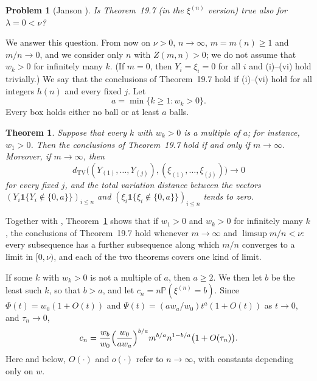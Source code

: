 \documentclass[11pt]{amsart}
\newtheorem{theorem}{Theorem}[section]
\newtheorem*{problem*}{Problem}
\theoremstyle{definition}
\theoremstyle{remark}
\numberwithin{equation}{section}
\newcommand{\Pp}{\mathbb P}
\newcommand{\dtv}{d_{\mathrm{TV}}}
\newcommand{\one}{\mathbf 1}
\begin{document}
\begin{problem*}[{Janson \cite[Problem~19.9]{J12}}]
Is Theorem~19.7 (in the $\xi^{(n)}$ version) true also for $\lambda=0<\nu$?
\end{problem*}

We answer this question. From now on $\nu>0$, $n\to\infty$, $m=m(n)\ge1$ and $m/n\to0$, and we consider only $n$ with $Z(m,n)>0$; we do not assume that $w_k>0$ for infinitely many $k$. (If $m=0$, then $Y_i=\xi_i=0$ for all $i$ and (i)--(vi) hold trivially.) We say that the conclusions of Theorem~19.7 hold if (i)--(vi) hold for all integers $h(n)$ and every fixed $j$. Let
\[
a=\min\{k\ge1:w_k>0\}.
\]
Every box holds either no ball or at least $a$ balls.

\begin{theorem}\label{thm:div}
Suppose that every $k$ with $w_k>0$ is a multiple of $a$; for instance, $w_1>0$. Then the conclusions of Theorem~19.7 hold if and only if $m\to\infty$. Moreover, if $m\to\infty$, then
\[
\dtv\bigl((Y_{(1)},\dots,Y_{(j)}),(\xi_{(1)},\dots,\xi_{(j)})\bigr)\to0
\]
for every fixed $j$, and the total variation distance between the vectors $(Y_i\one\{Y_i\notin\{0,a\}\})_{i\le n}$ and $(\xi_i\one\{\xi_i\notin\{0,a\}\})_{i\le n}$ tends to zero.
\end{theorem}

Together with \cite[Theorem~19.7 and Remark~19.8]{J12}, Theorem~\ref{thm:div} shows that if $w_1>0$ and $w_k>0$ for infinitely many $k$, the conclusions of Theorem~19.7 hold whenever $m\to\infty$ and $\limsup m/n<\nu$: every subsequence has a further subsequence along which $m/n$ converges to a limit in $[0,\nu)$, and each of the two theorems covers one kind of limit.

If some $k$ with $w_k>0$ is not a multiple of $a$, then $a\ge2$. We then let $b$ be the least such $k$, so that $b>a$, and let $c_n=n\Pp(\xi^{(n)}=b)$. Since $\Phi(t)=w_0(1+O(t))$ and $\Psi(t)=(aw_a/w_0)t^a(1+O(t))$ as $t\to0$, and $\tau_n\to0$,
\begin{equation}\label{eq:cn}
c_n=\frac{w_b}{w_0}\Bigl(\frac{w_0}{aw_a}\Bigr)^{b/a}m^{b/a}n^{1-b/a}\bigl(1+O(\tau_n)\bigr).
\end{equation}
Here and below, $O(\cdot)$ and $o(\cdot)$ refer to $n\to\infty$, with constants depending only on $w$.
\end{document}
